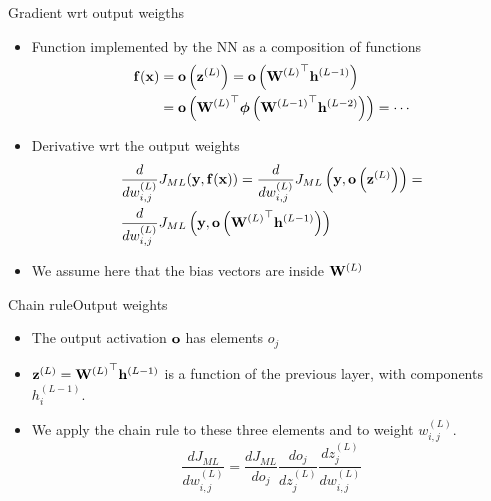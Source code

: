 \documentclass{beamer}
\begin{document}
\begin{frame}{Gradient wrt output weigths}

\begin{itemize}
\item Function implemented by the NN as a composition of functions 
\begin{equation}
\begin{split}
    {\bf f}({\bf x})  &=  {\bf o}\left({\bf z}^{(L)}\right) = {\bf o}\left({{\bf W}^{(L)}}^\top{\bf h}^{(L-1)}\right) \\
    &={\bf o}\left({{\bf W}^{(L)}}^\top\boldsymbol{\mathit{\phi}}\left({{\bf W}^{(L-1)}}^\top{\bf h}^{(L-2)}\right)\right)=\cdots
    \end{split}
\end{equation}
\item Derivative wrt the output weights
\begin{equation}
\begin{split}
&\frac{d}{dw_{i,j}^{(L)}}   J_{ML}({\bf y},{\bf f}({\bf x}))= \frac{d}{dw_{i,j}^{(L)}}  J_{ML}\left({\bf y},{\bf o}\left({\bf z}^{(L)}\right)\right)=\\ 
&\frac{d}{dw_{i,j}^{(L)}}  J_{ML}\left({\bf y},{\bf o}\left({{\bf W}^{(L)}}^\top{\bf h}^{(L-1)}\right)\right)
\end{split}
\end{equation} 
\item We assume here that the bias vectors are inside ${\bf W}^{(L)}$
    \end{itemize}
\end{frame}

\begin{frame}{Chain rule}{Output weights}
    \begin{itemize}
        \item The output activation ${\bf o}$ has elements $o_j$ 
        \item ${\bf z}^{(L)} = {{\bf W}^{(L)}}^\top{\bf h}^{(L-1)}$ is a function of the previous layer, with components  $h_i^{(L-1)}$. 
        \item We apply the chain rule to these three elements and to weight $w^{(L)}_{i,j}$.  
\begin{equation}
\frac{dJ_{ML}}{dw_{i,j}^{(L)}}=\frac{dJ_{ML}}{do_{j}} \frac{do_j}{dz_{j}^{(L)}}\frac{dz_j^{(L)}}{dw_{i,j}^{(L)}}
\end{equation}

    \end{itemize}
\end{frame}
\end{document}
